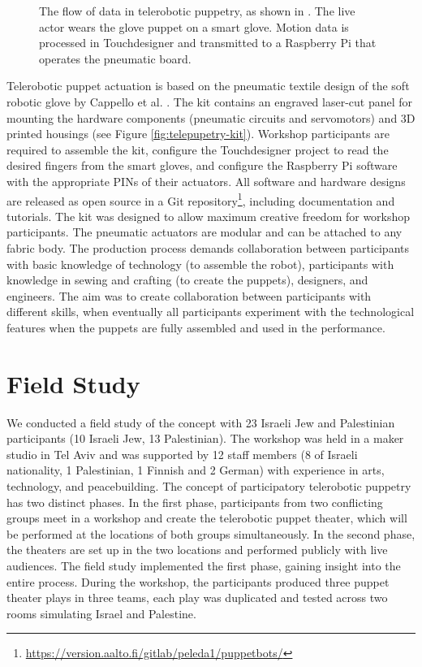 \documentclass[dissertation,math,vertlayout,pdfa,colorlinks]{aaltoseries}
\begin{document}
\begin{figure}
    \centering
    
    \caption{The flow of data in telerobotic puppetry, as shown in \cite{peledTeleroboticTheaterOppressed2025}. The live actor wears the glove puppet on a smart glove. Motion data is processed in Touchdesigner and transmitted to a Raspberry Pi that operates the pneumatic board.}
    \label{fig:telepuppetry-diagram}
\end{figure}

Telerobotic puppet actuation is based on the pneumatic textile design of the soft robotic glove by Cappello et al. \cite{cappelloExploitingTextileMechanical2018,cappelloAssistingHandFunction2018}. The kit contains an engraved laser-cut panel for mounting the hardware components (pneumatic circuits and servomotors) and 3D printed housings (see Figure \ref{fig:telepupetry-kit}). Workshop participants are required to assemble the kit, configure the Touchdesigner project to read the desired fingers from the smart gloves, and configure the Raspberry Pi software with the appropriate PINs of their actuators. All software and hardware designs are released as open source in a Git repository\footnote{\url{https://version.aalto.fi/gitlab/peleda1/puppetbots/}}, including documentation and tutorials. The kit was designed to allow maximum creative freedom for workshop participants. The pneumatic actuators are modular and can be attached to any fabric body. The production process demands collaboration between participants with basic knowledge of technology (to assemble the robot), participants with knowledge in sewing and crafting (to create the puppets), designers, and engineers. The aim was to create collaboration between participants with different skills, when eventually all participants experiment with the technological features when the puppets are fully assembled and used in the performance.

\section{Field Study}
We conducted a field study of the concept with 23 Israeli Jew and Palestinian participants (10 Israeli Jew, 13 Palestinian). The workshop was held in a maker studio in Tel Aviv and was supported by 12 staff members (8 of Israeli nationality, 1 Palestinian, 1 Finnish and 2 German) with experience in arts, technology, and peacebuilding. The concept of participatory telerobotic puppetry has two distinct phases. In the first phase, participants from two conflicting groups meet in a workshop and create the telerobotic puppet theater, which will be performed at the locations of both groups simultaneously. In the second phase, the theaters are set up in the two locations and performed publicly with live audiences. The field study implemented the first phase, gaining insight into the entire process. During the workshop, the participants produced three puppet theater plays in three teams, each play was duplicated and tested across two rooms simulating Israel and Palestine.
\end{document}
